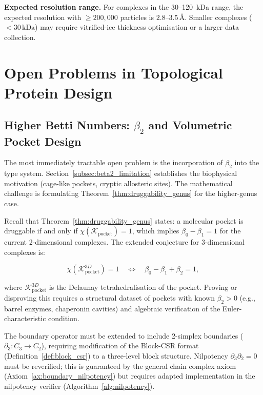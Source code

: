 \noindent\textbf{Expected resolution range.}  For complexes in the
30--120~kDa range, the expected resolution with $\ge 200,000$ particles is
$2.8$--$3.5\,\text{\AA}$.  Smaller complexes ($<30\,\mathrm{kDa}$) may
require vitrified-ice thickness optimisation or a larger data collection.

\section{Open Problems in Topological Protein Design}
\label{sec:open_problems}

\subsection{Higher Betti Numbers: $\beta_2$ and Volumetric Pocket Design}
\label{subsec:beta2_open}

The most immediately tractable open problem is the incorporation of $\beta_2$
into the \PLQ{} type system.  Section~\ref{subsec:beta2_limitation} establishes
the biophysical motivation (cage-like pockets, cryptic allosteric sites).  The
mathematical challenge is formulating Theorem~\ref{thm:druggability_genus} for
the higher-genus case.

Recall that Theorem~\ref{thm:druggability_genus} states: a molecular pocket is
druggable if and only if $\chi(\mathcal{K}_{\text{pocket}}) = 1$, which implies
$\beta_0 - \beta_1 = 1$ for the current 2-dimensional complexes.  The extended
conjecture for 3-dimensional complexes is:

\begin{equation}
  \chi(\mathcal{K}_{\text{pocket}}^{3D}) = 1
  \quad \Longleftrightarrow \quad
  \beta_0 - \beta_1 + \beta_2 = 1,
\end{equation}

\noindent where $\mathcal{K}_{\text{pocket}}^{3D}$ is the Delaunay
tetrahedralisation of the pocket.  Proving or disproving this requires a
structural dataset of pockets with known $\beta_2 > 0$ (e.g., barrel
enzymes, chaperonin cavities) and algebraic verification of the
Euler-characteristic condition.

The boundary operator must be extended to include 2-simplex boundaries
($\partial_3: C_3 \to C_2$), requiring modification of the Block-CSR format
(Definition~\ref{def:block_csr}) to a three-level block structure.
Nilpotency $\partial_3 \partial_2 = 0$ must be reverified; this is
guaranteed by the general chain complex axiom (Axiom~\ref{ax:boundary_nilpotency})
but requires adapted implementation in the nilpotency verifier
(Algorithm~\ref{alg:nilpotency}).

